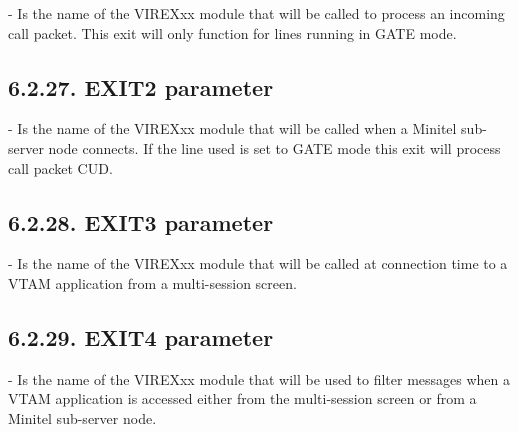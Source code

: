 \documentclass[letterpaper,10pt,english]{sphinxmanual}
\begin{document}
 - Is the name of the VIREXxx module that will be called to process an incoming call packet. This exit will only function for lines running in GATE mode.


\subsection{6.2.27. EXIT2 parameter}
\label{\detokenize{Installation_Guide:exit2-parameter}}
\begin{sphinxVerbatim}[commandchars=\\\{\}]
 
\end{sphinxVerbatim}

 - Is the name of the VIREXxx module that will be called when a Minitel sub-server node connects. If the line used is set to GATE mode this exit will process call packet CUD.


\subsection{6.2.28. EXIT3 parameter}
\label{\detokenize{Installation_Guide:exit3-parameter}}
\begin{sphinxVerbatim}[commandchars=\\\{\}]
 
\end{sphinxVerbatim}

 - Is the name of the VIREXxx module that will be called at connection time to a VTAM application from a multi-session screen.


\subsection{6.2.29. EXIT4 parameter}
\label{\detokenize{Installation_Guide:exit4-parameter}}
\begin{sphinxVerbatim}[commandchars=\\\{\}]
 
\end{sphinxVerbatim}

 - Is the name of the VIREXxx module that will be used to filter messages when a VTAM application is accessed either from the multi-session screen or from a Minitel sub-server node.
\end{document}
